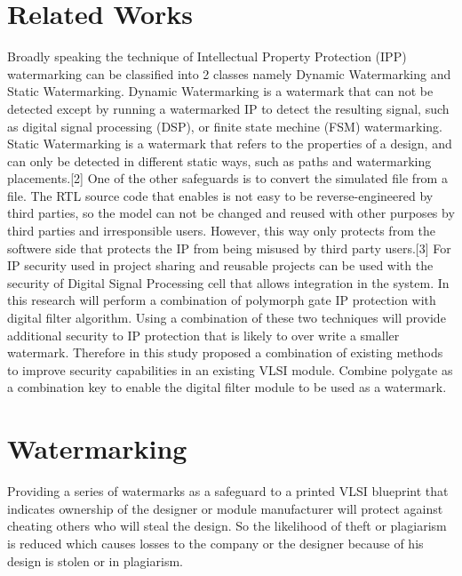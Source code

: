 \documentclass[10pt,journal,compsoc]{IEEEtran}
\begin{document}

\section{Related Works}
Broadly speaking the technique of Intellectual Property Protection (IPP) watermarking can be classified into 2 classes namely Dynamic Watermarking and Static Watermarking. Dynamic Watermarking is a watermark that can not be detected except by running a watermarked IP to detect the resulting signal, such as digital signal processing (DSP), or finite state mechine (FSM) watermarking. Static Watermarking is a watermark that refers to the properties of a design, and can only be detected in different static ways, such as paths and watermarking placements.[2] One of the other safeguards is to convert the simulated file from a file. The RTL source code that enables is not easy to be reverse-engineered by third parties, so the model can not be changed and reused with other purposes by third parties and irresponsible users. However, this way only protects from the softwere side that protects the IP from being misused by third party users.[3] For IP security used in project sharing and reusable projects can be used with the security of Digital Signal Processing cell that allows integration in the system. In this research will perform a combination of polymorph gate IP protection with digital filter algorithm. Using a combination of these two techniques will provide additional security to IP protection that is likely to over write a smaller watermark. Therefore in this study proposed a combination of existing methods to improve security capabilities in an existing VLSI module. Combine polygate as a combination key to enable the digital filter module to be used as a watermark.


\section{Watermarking}
Providing a series of watermarks as a safeguard to a printed VLSI blueprint that indicates ownership of the designer or module manufacturer will protect against cheating others who will steal the design. So the likelihood of theft or plagiarism is reduced which causes losses to the company or the designer because of his design is stolen or in plagiarism.
\end{document}

